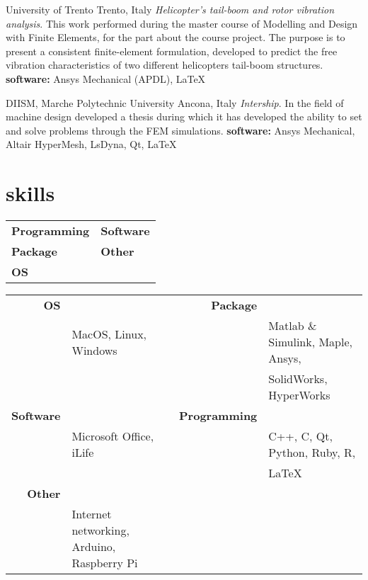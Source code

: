\documentclass[a4,oneside]{friggeri-cv} %
\begin{document}
\begin{entrylist}     
    {University of Trento}
    {Trento, Italy}
    {\emph{Helicopter's tail-boom and rotor vibration analysis}.}
    {This work performed during the master course of Modelling and Design with
Finite Elements, for the part about the course project. The purpose is to
present a consistent finite-element formulation, developed to predict the free
vibration characteristics of two different helicopters tail-boom structures.}
    {\textbf{software: } Ansys Mechanical (APDL), \LaTeX}
    {\href{https://github.com/frank1789/FEM-Analysis---Helicopter-s-Tail}{\faGithub}}
      
      
    {DIISM, Marche Polytechnic University}
    {Ancona, Italy}
    {\emph{Intership}.}
    {In the field of machine design developed a thesis during which it has
    developed the ability to set and solve problems through the FEM
    simulations.}
    {\textbf{software: } Ansys Mechanical, Altair  HyperMesh, LsDyna, Qt, \LaTeX}
    {\href{https://github.com/frank1789/LsDynaToAPDL}{\faGithub}}
      
    
  \end{entrylist}

\section{skills}
\begin{tabular}{p{60mm} p{60mm}}
\textbf{Programming}		& \textbf{Software}\\
\textbf{Package}\hfill	& \textbf{Other}\hfill\\
\textbf{OS}\hfill 		& \hfill\\
\end{tabular}



\begin{tabular}{rlrl}
\textbf{OS} && \textbf{Package}\\
& MacOS, Linux, Windows  &&  Matlab \& Simulink, Maple, Ansys,\\ &&& SolidWorks, HyperWorks \\
\textbf{Software} && \textbf{Programming}\\
&Microsoft Office, iLife &&  C++,  C, Qt, Python, Ruby, R, \\ &&&\LaTeX{} \\
\textbf{Other}\\
&Internet networking, Arduino, Raspberry Pi\\
\end{tabular}\\
\end{document}

